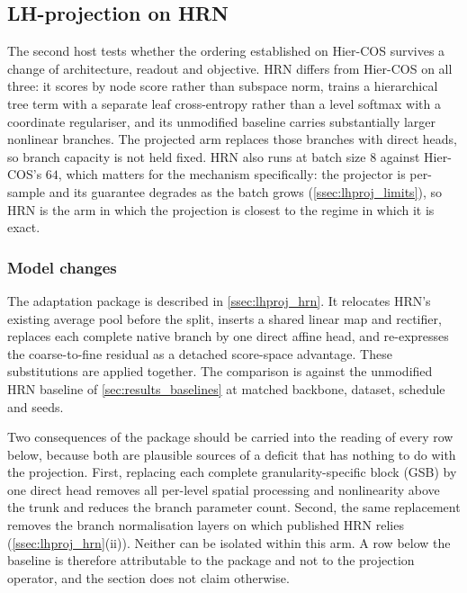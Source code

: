 \subsection{LH-projection on HRN}
\label{ssec:results_lhproj_hrn}

The second host tests whether the ordering established on Hier-COS survives a
change of architecture, readout and objective. HRN differs from Hier-COS on all
three: it scores by node score rather than subspace norm, trains a hierarchical
tree term with a separate leaf cross-entropy rather than a level softmax with a
coordinate regulariser, and its unmodified baseline carries substantially
larger nonlinear branches. The projected arm replaces those branches with direct
heads, so branch capacity is not held fixed. HRN also runs at batch size $8$
against Hier-COS's $64$, which
matters for the mechanism specifically: the projector is per-sample and its
guarantee degrades as the batch grows (\cref{ssec:lhproj_limits}), so HRN is the
arm in which the projection is closest to the regime in which it is exact.

\subsubsection{Model changes}

The adaptation package is described in \cref{ssec:lhproj_hrn}. It relocates
HRN's existing average pool before the split, inserts a shared linear map and
rectifier, replaces each complete native branch by one direct affine head, and
re-expresses the coarse-to-fine residual as a detached score-space advantage.
These substitutions are applied together. The comparison is
against the unmodified HRN baseline of \cref{sec:results_baselines} at matched
backbone, dataset, schedule and seeds.

Two consequences of the package should be carried into the reading of every row
below, because both are plausible sources of a deficit that has nothing to do
with the projection. First, replacing each complete granularity-specific block
(GSB) by one direct head
removes all per-level spatial processing and nonlinearity above the trunk and
reduces the branch parameter count. Second, the same replacement removes the
branch normalisation layers on which published HRN relies
(\cref{ssec:lhproj_hrn}(ii)). Neither can be isolated within this arm. A row below the
baseline is therefore attributable to the package and not to the projection
operator, and the section does not claim otherwise.

